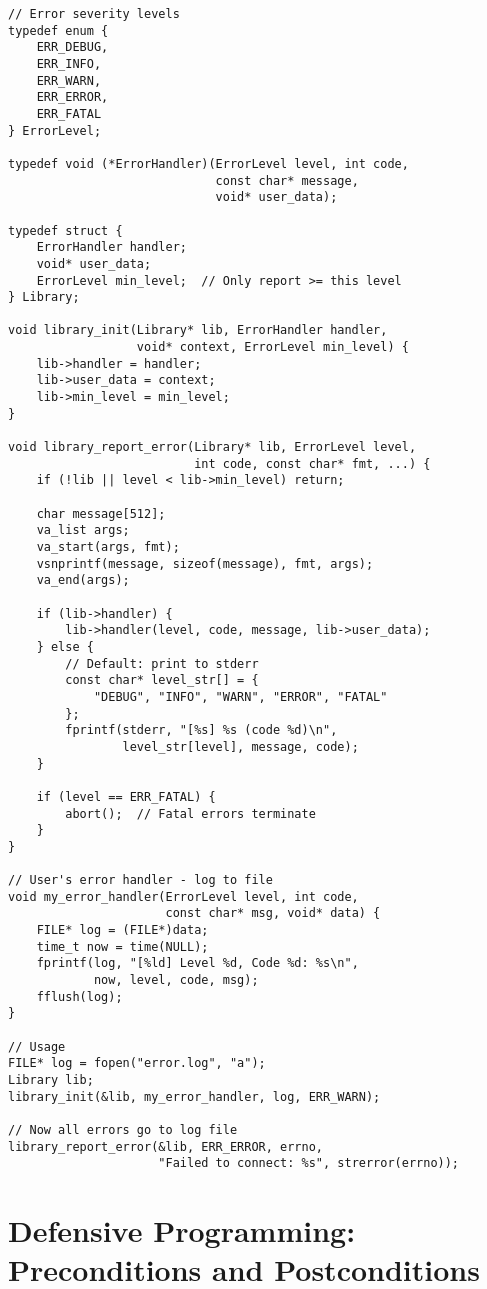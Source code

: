 \begin{lstlisting}
// Error severity levels
typedef enum {
    ERR_DEBUG,
    ERR_INFO,
    ERR_WARN,
    ERR_ERROR,
    ERR_FATAL
} ErrorLevel;

typedef void (*ErrorHandler)(ErrorLevel level, int code,
                             const char* message,
                             void* user_data);

typedef struct {
    ErrorHandler handler;
    void* user_data;
    ErrorLevel min_level;  // Only report >= this level
} Library;

void library_init(Library* lib, ErrorHandler handler,
                  void* context, ErrorLevel min_level) {
    lib->handler = handler;
    lib->user_data = context;
    lib->min_level = min_level;
}

void library_report_error(Library* lib, ErrorLevel level,
                          int code, const char* fmt, ...) {
    if (!lib || level < lib->min_level) return;

    char message[512];
    va_list args;
    va_start(args, fmt);
    vsnprintf(message, sizeof(message), fmt, args);
    va_end(args);

    if (lib->handler) {
        lib->handler(level, code, message, lib->user_data);
    } else {
        // Default: print to stderr
        const char* level_str[] = {
            "DEBUG", "INFO", "WARN", "ERROR", "FATAL"
        };
        fprintf(stderr, "[%s] %s (code %d)\n",
                level_str[level], message, code);
    }

    if (level == ERR_FATAL) {
        abort();  // Fatal errors terminate
    }
}

// User's error handler - log to file
void my_error_handler(ErrorLevel level, int code,
                      const char* msg, void* data) {
    FILE* log = (FILE*)data;
    time_t now = time(NULL);
    fprintf(log, "[%ld] Level %d, Code %d: %s\n",
            now, level, code, msg);
    fflush(log);
}

// Usage
FILE* log = fopen("error.log", "a");
Library lib;
library_init(&lib, my_error_handler, log, ERR_WARN);

// Now all errors go to log file
library_report_error(&lib, ERR_ERROR, errno,
                     "Failed to connect: %s", strerror(errno));
\end{lstlisting}

\section{Defensive Programming: Preconditions and Postconditions}

